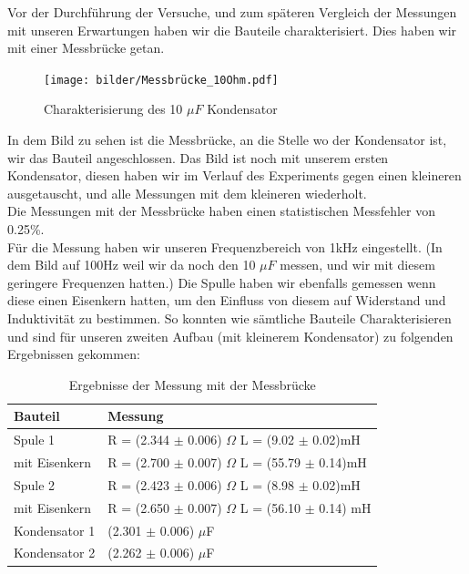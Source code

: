 \documentclass[twoside]{protokoll}
\begin{document}
Vor der Durchführung der Versuche, und zum späteren Vergleich der Messungen mit unseren Erwartungen haben wir die Bauteile charakterisiert. Dies haben wir mit einer Messbrücke getan. 

\begin{figure}[H]
    \centering
    \texttt{[image: bilder/Messbrücke\_10Ohm.pdf]}
    \caption{Charakterisierung des 10 $\mu F$ Kondensator}
\end{figure}

In dem Bild zu sehen ist die Messbrücke, an die Stelle wo der Kondensator ist, wir das Bauteil angeschlossen. Das Bild ist noch mit unserem ersten Kondensator, diesen haben wir im Verlauf des Experiments gegen einen kleineren ausgetauscht, und alle Messungen mit dem kleineren wiederholt.\\

Die Messungen mit der Messbrücke haben einen statistischen Messfehler von 0.25\%.\\
Für die Messung haben wir unseren Frequenzbereich von 1kHz eingestellt.
 (In dem Bild auf 100Hz weil wir da noch den 10 $\mu F$ messen, und wir mit diesem geringere Frequenzen hatten.) 
 Die Spulle haben wir ebenfalls gemessen wenn diese einen Eisenkern hatten, um den Einfluss von diesem auf Widerstand und Induktivität zu bestimmen.
So konnten wie sämtliche Bauteile Charakterisieren und sind für unseren zweiten Aufbau (mit kleinerem Kondensator) zu folgenden Ergebnissen gekommen:\\
    
\begin{table}[H]
        \centering
        \begin{tabularx}{1.0\textwidth}{X l} %
            \toprule
            \textbf{Bauteil} & \textbf{Messung} \\
            \midrule
            Spule 1 & R = (2.344 $\pm$ 0.006) $\Omega$ \quad L = (9.02 $\pm$ 0.02)mH \\
            mit Eisenkern & R = (2.700 $\pm$ 0.007) $\Omega$ \quad L = (55.79 $\pm$ 0.14)mH \\
            \midrule
            Spule 2 & R = (2.423 $\pm$ 0.006) $\Omega$ \quad L = (8.98 $\pm$ 0.02)mH \\
            mit Eisenkern & R = (2.650 $\pm$ 0.007) $\Omega$ \quad L = (56.10 $\pm$ 0.14) mH \\
            \midrule
            Kondensator 1 & (2.301 $\pm$ 0.006) $\mu$F \\
            Kondensator 2 & (2.262 $\pm$ 0.006) $\mu$F \\
            \bottomrule
        \end{tabularx}
        \caption{Ergebnisse der Messung mit der Messbrücke}
        \label{tab:mytable}
    \end{table}
\end{document}
